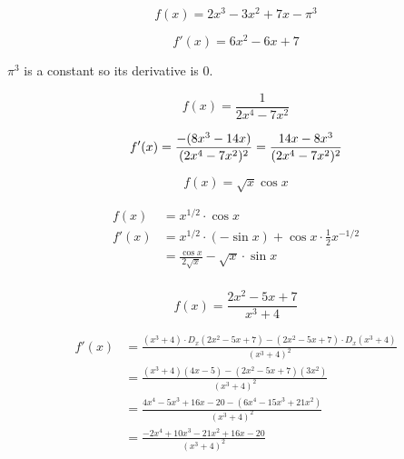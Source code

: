 \documentclass[fleqn,addpoints]{exam}
\begin{document}
\begin{questions}


\question[3]
\label{derivative:first}
\[
  f(x) = 2x^3 - 3x^2 + 7x - \pi^3
\]
\begin{solution}[2 cm]
\[
  f'(x) = 6x^2 - 6x + 7
\]

$\pi^3$ is a constant so its derivative is 0.

\end{solution}

\ifprintanswers
\else
\pagebreak
\fi

\question[5]
\[
  f(x) = \frac{1}{2x^4 - 7x^2}
\]
\begin{solution}[4 cm]
\[
  f'(x) = \frac{-(8x^3 - 14x)}{(2x^4 - 7x^2)^2} = \frac{14x - 8x^3}{(2x^4 - 7x^2)^2} \\
\]

\end{solution}

\question[7]
\[
  f(x) = \sqrt{x} \cos x
\]
\begin{solution}[5 cm]
\begin{align*}
  f(x) &= x^{1/2} \cdot \cos x
  \\
  f'(x) &= x^{1/2} \cdot (-\sin x) + \cos x \cdot \frac{1}{2} x^{-1/2} \\
        &= \frac{\cos x}{2 \sqrt{x}} - \sqrt{x} \cdot \sin x \\
\end{align*}

\end{solution}

\ifprintanswers
\pagebreak
\fi

\question[10]
\[
  f(x) = \frac{2x^2 - 5x + 7}{x^3 + 4}
\]
\begin{solution}[7 cm]
\begin{align*}
  f'(x) &= \frac{(x^3 + 4) \cdot D_x(2x^2 - 5x + 7) - (2x^2 - 5x + 7) \cdot D_x(x^3 + 4)}{(x^3 + 4)^2} \\
        &= \frac{(x^3 + 4)(4x - 5) - (2x^2 - 5x + 7)(3x^2)}{(x^3 + 4)^2} \\
        &= \frac{4x^4 - 5x^3 + 16x - 20 - (6x^4 - 15x^3 + 21x^2)}{(x^3 + 4)^2} \\
        &= \frac{-2x^4 + 10x^3 - 21x^2 + 16x - 20}{(x^3 + 4)^2} \\
\end{align*}
\end{solution}


\end{questions}
\end{document}
